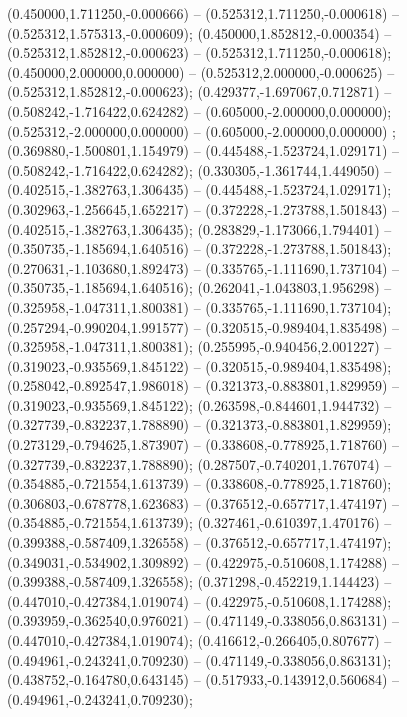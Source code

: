  (0.450000,1.711250,-0.000666) -- (0.525312,1.711250,-0.000618) -- (0.525312,1.575313,-0.000609);
 (0.450000,1.852812,-0.000354) -- (0.525312,1.852812,-0.000623) -- (0.525312,1.711250,-0.000618);
 (0.450000,2.000000,0.000000) -- (0.525312,2.000000,-0.000625) -- (0.525312,1.852812,-0.000623);
 (0.429377,-1.697067,0.712871) -- (0.508242,-1.716422,0.624282) -- (0.605000,-2.000000,0.000000);
 (0.525312,-2.000000,0.000000) -- (0.605000,-2.000000,0.000000) ;
 (0.369880,-1.500801,1.154979) -- (0.445488,-1.523724,1.029171) -- (0.508242,-1.716422,0.624282);
 (0.330305,-1.361744,1.449050) -- (0.402515,-1.382763,1.306435) -- (0.445488,-1.523724,1.029171);
 (0.302963,-1.256645,1.652217) -- (0.372228,-1.273788,1.501843) -- (0.402515,-1.382763,1.306435);
 (0.283829,-1.173066,1.794401) -- (0.350735,-1.185694,1.640516) -- (0.372228,-1.273788,1.501843);
 (0.270631,-1.103680,1.892473) -- (0.335765,-1.111690,1.737104) -- (0.350735,-1.185694,1.640516);
 (0.262041,-1.043803,1.956298) -- (0.325958,-1.047311,1.800381) -- (0.335765,-1.111690,1.737104);
 (0.257294,-0.990204,1.991577) -- (0.320515,-0.989404,1.835498) -- (0.325958,-1.047311,1.800381);
 (0.255995,-0.940456,2.001227) -- (0.319023,-0.935569,1.845122) -- (0.320515,-0.989404,1.835498);
 (0.258042,-0.892547,1.986018) -- (0.321373,-0.883801,1.829959) -- (0.319023,-0.935569,1.845122);
 (0.263598,-0.844601,1.944732) -- (0.327739,-0.832237,1.788890) -- (0.321373,-0.883801,1.829959);
 (0.273129,-0.794625,1.873907) -- (0.338608,-0.778925,1.718760) -- (0.327739,-0.832237,1.788890);
 (0.287507,-0.740201,1.767074) -- (0.354885,-0.721554,1.613739) -- (0.338608,-0.778925,1.718760);
 (0.306803,-0.678778,1.623683) -- (0.376512,-0.657717,1.474197) -- (0.354885,-0.721554,1.613739);
 (0.327461,-0.610397,1.470176) -- (0.399388,-0.587409,1.326558) -- (0.376512,-0.657717,1.474197);
 (0.349031,-0.534902,1.309892) -- (0.422975,-0.510608,1.174288) -- (0.399388,-0.587409,1.326558);
 (0.371298,-0.452219,1.144423) -- (0.447010,-0.427384,1.019074) -- (0.422975,-0.510608,1.174288);
 (0.393959,-0.362540,0.976021) -- (0.471149,-0.338056,0.863131) -- (0.447010,-0.427384,1.019074);
 (0.416612,-0.266405,0.807677) -- (0.494961,-0.243241,0.709230) -- (0.471149,-0.338056,0.863131);
 (0.438752,-0.164780,0.643145) -- (0.517933,-0.143912,0.560684) -- (0.494961,-0.243241,0.709230);
